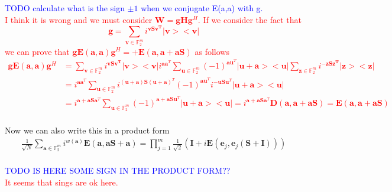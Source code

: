 \documentclass{article}
\begin{document}
	
	\textcolor{blue}{
		TODO calculate what is the sign $\pm 1$ when we conjugate E(a,a) with g.	
	}
	\\
	
	\textcolor{red}{
		I think it is wrong and we must consider $\mathbf{W} = \mathbf{g}\mathbf{H}\mathbf{g}^H$. If we consider the fact that 
\begin{equation}
	\mathbf{g} = \sum_{\mathbf{v} \in \mathbb{F}^m_2}{i^{\mathbf{v S v^T}} |\mathbf{v}><\mathbf{v}|}
\end{equation}
we can prove that $\mathbf{g}\mathbf{E}(\mathbf{a},\mathbf{a}) \mathbf{g}^H = +\mathbf{E}(\mathbf{a,a+a S})$ as follows
\begin{align}
	\mathbf{g} \mathbf{E}(\mathbf{a,a}) \mathbf{g}^H &=\sum_{\mathbf{v} \in \mathbb{F}^m_2}{i^{\mathbf{v S v^T}} |\mathbf{v}><\mathbf{v}|} i^{\mathbf{a}\mathbf{a}^T}\sum_{\mathbf{u} \in \mathbb{F}^m_2}{(-1)^{\mathbf{a}\mathbf{u}^T} |\mathbf{u+a}><\mathbf{u}|}\sum_{\mathbf{z} \in \mathbb{F}^m_2}{i^{-\mathbf{z S z^T}} |\mathbf{z}><\mathbf{z}|} \nonumber \\
	&= i^{\mathbf{a}\mathbf{a}^T}\sum_{\mathbf{u} \in \mathbb{F}^m_2}{i^{\mathbf{(u+a)S}(\mathbf{u+a})^T} (-1)^{\mathbf{a}\mathbf{u}^T}i^{-\mathbf{uS}\mathbf{u}^T} |\mathbf{u+a}><\mathbf{u}|} \nonumber \\
	&= i^{\mathbf{a+aS}\mathbf{a}^T}\sum_{\mathbf{u} \in \mathbb{F}^m_2}{(-1)^{\mathbf{a+aS}\mathbf{u}^T} |\mathbf{u+a}><\mathbf{u}|}= i^{\mathbf{a+aS}\mathbf{a}^T}\mathbf{D}(\mathbf{a, a+aS}) = \mathbf{E}(\mathbf{a, a+aS})
\end{align}
}
	\\
	
	Now we can also write this in a product form
	\begin{align*}
		\frac{1}{\sqrt{N}} \sum_{\mathbf{a} \in \mathbb{F}^m_2} i^{w(\mathbf{a})}\mathbf{E}(\mathbf{a},\mathbf{a}\mathbf{S} + \mathbf{a}) = \prod_{j = 1}^m\frac{1}{\sqrt{2}}(\mathbf{I} + i\mathbf{E}(\mathbf{e}_j, \mathbf{e}_j(\mathbf{S} + \mathbf{I})))
	\end{align*}
	\\
	
	\textcolor{blue}{TODO IS HERE SOME SIGN IN THE PRODUCT FORM??}
	\\
	
	\textcolor{red}{It seems that sings are ok here.}
	
\end{document}
